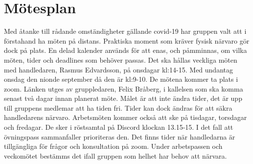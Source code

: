 \documentclass[a4paper]{article}
\begin{document}

\section{Mötesplan}
\label{sec:mötesplan}

Med åtanke till rådande omständigheter gällande covid-19 har gruppen valt att i förstahand ha möten på distans.
Praktiska moment som kräver fysisk närvaro gör dock på plats.
En delad kalender används för att enas, och påmminnas, om vilka möten, tider och deadlines som behöver passas.
\newline
\newline
Det ska hållas veckliga möten med handledaren, Rasmus Edvardsson, på onsdagar kl:14-15. Med undantag onsdag den nionde september då den är kl:9-10. De mötena kommer ta plats i zoom. Länken utges av gruppledaren, Felix Bråberg, i kallelsen som ska komma senast två dagar innan planerat möte. Målet är att inte ändra tider, det är upp till gruppens medlemar att ha tiden fri. Tider kan dock ändras för att säkra handledarens närvaro.
\newline
\newline
Arbetsmöten kommer också att ske på tisdagar, torsdagar och fredagar. De sker i röstsamtal på Discord klockan 13.15-15. I det fall att övningspass sammanfaller prioriteras den. Det finns tider när handledarna är tillgängliga för frågor och konsultation på zoom. Under arbetspassen och veckomötet bestämms det ifall gruppen som helhet har behov att närvara. 
\end{document}
